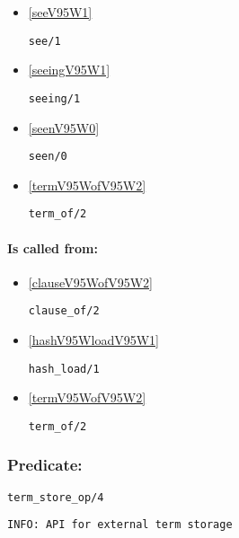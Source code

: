 \begin{itemize}
\item \ref{seeV95W1} 
\begin{verbatim}
see/1
\end{verbatim}

\item \ref{seeingV95W1} 
\begin{verbatim}
seeing/1
\end{verbatim}

\item \ref{seenV95W0} 
\begin{verbatim}
seen/0
\end{verbatim}

\item \ref{termV95WofV95W2} 
\begin{verbatim}
term_of/2
\end{verbatim}

\end{itemize}
\paragraph{Is called from:} 
\begin{itemize}
\item \ref{clauseV95WofV95W2} 
\begin{verbatim}
clause_of/2
\end{verbatim}

\item \ref{hashV95WloadV95W1} 
\begin{verbatim}
hash_load/1
\end{verbatim}

\item \ref{termV95WofV95W2} 
\begin{verbatim}
term_of/2
\end{verbatim}

\end{itemize}

\subsubsection{Predicate:} \label{termV95WstoreV95WopV95W4}

\begin{verbatim}
term_store_op/4
\end{verbatim}

{\small \begin{verbatim}
INFO: API for external term storage

\end{verbatim}}
